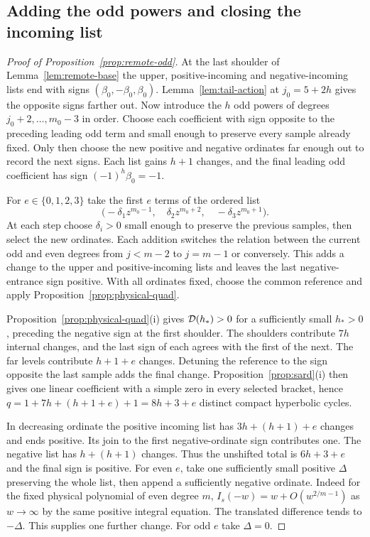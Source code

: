 \subsection{Adding the odd powers and closing the incoming list}
\begin{proof}[Proof of Proposition~\ref{prop:remote-odd}]
At the last shoulder of Lemma~\ref{lem:remote-base} the upper,
positive-incoming and negative-incoming lists end with signs
$(\beta_0,-\beta_0,\beta_0)$. Lemma~\ref{lem:tail-action} at
$j_0=5+2h$ gives the opposite signs farther out. Now introduce the
$h$ odd powers of degrees $j_0+2,\ldots,m_0-3$ in order. Choose each
coefficient with sign opposite to the preceding leading odd term and
small enough to preserve every sample already fixed. Only then choose
the new positive and negative ordinates far enough out to record the
next signs. Each list gains $h+1$ changes, and the final leading odd
coefficient has sign $(-1)^h\beta_0=-1$.

For $e\in\{0,1,2,3\}$ take the first $e$ terms of the ordered list
\[
  \bigl(-\delta_1 z^{m_0-1},\quad \delta_2 z^{m_0+2},\quad
        -\delta_3 z^{m_0+1}\bigr).
\]
At each step choose $\delta_i>0$ small enough to preserve the previous
samples, then select the new ordinates. Each addition switches
the relation between the current odd and even degrees from $j<m-2$
to $j=m-1$ or conversely. This adds a change to the upper and
positive-incoming lists and leaves the last negative-entrance sign
positive. With all ordinates fixed, choose the common reference and
apply Proposition~\ref{prop:physical-quad}.

Proposition~\ref{prop:physical-quad}(i) gives $\mathcal{D}(h_*)>0$ for a
sufficiently small $h_*>0$, preceding the negative sign at the
first shoulder. The shoulders contribute $7h$ internal changes,
and the last sign of each agrees with the first of the next. The far levels
contribute $h+1+e$ changes. Detuning the reference to the sign opposite
the last sample adds the final change. Proposition~\ref{prop:sard}(i)
then gives one linear coefficient with a simple zero in every selected
bracket, hence $q=1+7h+(h+1+e)+1=8h+3+e$ distinct compact hyperbolic cycles.

In decreasing ordinate the positive incoming list has $3h+(h+1)+e$
changes and ends positive. Its join to the first negative-ordinate
sign contributes one. The negative list has $h+(h+1)$ changes.
Thus the unshifted total is $6h+3+e$ and the final sign is positive.
For even $e$, take one sufficiently small positive $\Delta$ preserving
the whole list, then append a sufficiently negative ordinate. Indeed for
the fixed physical polynomial of even degree $m$, $I_s(-w)=w+O(w^{2/m-1})$
as $w\to\infty$ by the same positive integral equation. The translated
difference tends to $-\Delta$. This supplies one further change.
For odd $e$ take $\Delta=0$.


\end{proof}

